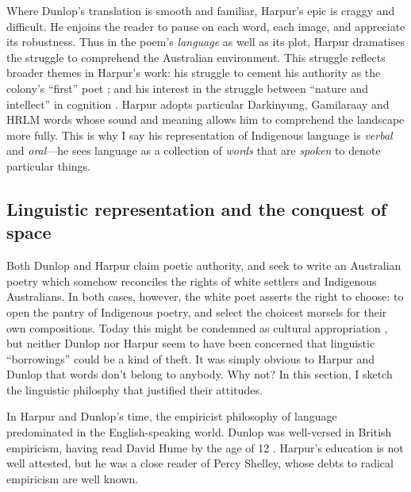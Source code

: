 \documentclass[
  Crown,
  times,
  sageh]{sagej}
\begin{document}
Where Dunlop's translation is smooth and familiar, Harpur's epic is
craggy and difficult. He enjoins the reader to pause on each word, each
image, and appreciate its robustness. Thus in the poem's \emph{language}
as well as its plot, Harpur dramatises the struggle to comprehend the
Australian environment. This struggle reflects broader themes in
Harpur's work: his struggle to cement his authority as the colony's
``first'' poet \citep{mead_charles_1990}; and his interest in the
struggle between ``nature and intellect'' in cognition
\citep[460]{ackland_charles_1983}. Harpur adopts particular Darkinyung,
Gamilaraay and HRLM words whose sound and meaning allows him to
comprehend the landscape more fully. This is why I say his
representation of Indigenous language is \emph{verbal} and
\emph{oral}---he sees language as a collection of \emph{words} that are
\emph{spoken} to denote particular things.

\subsection{Linguistic representation and the conquest of
space}\label{linguistic-representation-and-the-conquest-of-space}

Both Dunlop and Harpur claim poetic authority, and seek to write an
Australian poetry which somehow reconciles the rights of white settlers
and Indigenous Australians. In both cases, however, the white poet
asserts the right to choose: to open the pantry of Indigenous poetry,
and select the choicest morsels for their own compositions. Today this
might be condemned as cultural appropriation
\citetext{\citealp[85]{oleary_giving_2004}; \citealp[47]{johnston_poetry_2021}},
but neither Dunlop nor Harpur seem to have been concerned that
linguistic ``borrowings'' could be a kind of theft. It was simply
obvious to Harpur and Dunlop that words don't belong to anybody. Why
not? In this section, I sketch the linguistic philosphy that justified
their attitudes.

In Harpur and Dunlop's time, the empiricist philosophy of language
predominated in the English-speaking world. Dunlop was well-versed in
British empiricism, having read David Hume by the age of 12
\citep[76]{hansord_imperial_2021}. Harpur's education is not well
attested, but he was a close reader of Percy Shelley, whose debts to
radical empiricism are well known.
\end{document}
